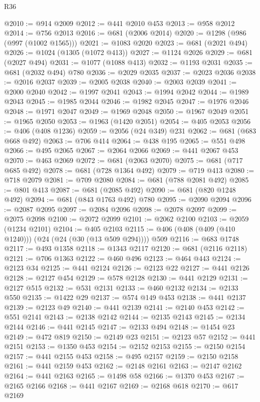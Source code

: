 \begin{lexlean}{R36}
\begin{coremodule}
@2010 := @914 @2009
@2012 := @441 @2010 @453
@2013 := @958 @2012
@2014 := @756 @2013
@2016 := @681 (@2006 @2014)
@2020 := @1298 (@986 (@997 (@1002 @1565)))
@2021 := @1083 @2020
@2023 := @681 (@2021 @494)
@2026 := @1024 (@1305 (@1072 @413))
@2027 := @1124 @2026
@2029 := @681 (@2027 @494)
@2031 := @1077 (@1088 @413)
@2032 := @1193 @2031
@2035 := @681 (@2032 @494) @780
@2036 := @2029 @2035
@2037 := @2023 @2036
@2038 := @2016 @2037
@2039 := @2005 @2038
@2040 := @2003 @2039
@2041 := @2000 @2040
@2042 := @1997 @2041
@2043 := @1994 @2042
@2044 := @1989 @2043
@2045 := @1985 @2044
@2046 := @1982 @2045
@2047 := @1976 @2046
@2048 := @1971 @2047
@2049 := @1969 @2048
@2050 := @1967 @2049
@2051 := @1965 @2050
@2053 := @1963 (@1420 @2051)
@2054 := @405 @2053
@2056 := @406 (@408 @1236)
@2059 := @2056 (@24 @349) @231
@2062 := @681 (@683 @668 @492)
@2063 := @706 @414
@2064 := @438 @195
@2065 := @551 @498
@2066 := @495 @2065
@2067 := @2064 @2066
@2069 := @441 @2067 @453
@2070 := @463 @2069
@2072 := @681 (@2063 @2070)
@2075 := @681 (@717 @685 @492)
@2078 := @681 (@728 @1364 @492)
@2079 := @719 @413
@2080 := @718 @2079
@2081 := @709 @2080
@2084 := @681 (@788 @2081 @492)
@2085 := @801 @413
@2087 := @681 (@2085 @492)
@2090 := @681 (@820 @1248 @492)
@2094 := @681 (@843 @1763 @492) @780
@2095 := @2090 @2094
@2096 := @2087 @2095
@2097 := @2084 @2096
@2098 := @2078 @2097
@2099 := @2075 @2098
@2100 := @2072 @2099
@2101 := @2062 @2100
@2103 := @2059 (@1234 @2101)
@2104 := @405 @2103
@2115 := @406 (@408 (@409 (@410 @1240))) (@24 (@24 (@30 (@13 @509 @294)))) @509
@2116 := @683 @1748
@2117 := @493 @1358
@2118 := @1343 @2117
@2120 := @681 (@2116 @2118)
@2121 := @706 @1363
@2122 := @460 @496
@2123 := @464 @443
@2124 := @2123 @34
@2125 := @441 @2124
@2126 := @2123 @22
@2127 := @441 @2126
@2128 := @2127 @454
@2129 := @578 @2128
@2130 := @441 @2129
@2131 := @2127 @515
@2132 := @531 @2131
@2133 := @460 @2132
@2134 := @2133 @550
@2135 := @1422 @29
@2137 := @574 @149 @453
@2138 := @441 @2137
@2139 := @2123 @49
@2140 := @441 @2139
@2141 := @2140 @453
@2142 := @551 @2141
@2143 := @2138 @2142
@2144 := @2135 @2143
@2145 := @2134 @2144
@2146 := @441 @2145
@2147 := @2133 @494
@2148 := @1454 @23
@2149 := @472 @819
@2150 := @2149 @23
@2151 := @2123 @57
@2152 := @441 @2151
@2153 := @1350 @453
@2154 := @2152 @2153
@2155 := @2150 @2154
@2157 := @441 @2155 @453
@2158 := @495 @2157
@2159 := @2150 @2158
@2161 := @441 @2159 @453
@2162 := @2148 @2161
@2163 := @2147 @2162
@2164 := @441 @2163
@2165 := @1498 @58
@2166 := @1370 @453
@2167 := @2165 @2166
@2168 := @441 @2167
@2169 := @2168 @618
@2170 := @617 @2169

\end{coremodule}
\end{lexlean}
